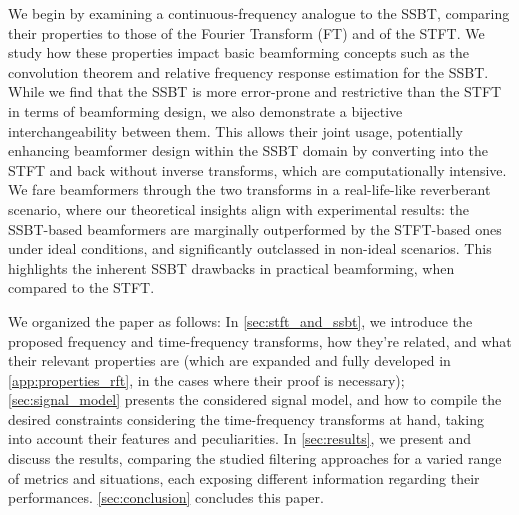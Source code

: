 
We begin by examining a continuous-frequency analogue to the SSBT, comparing their properties to those of the Fourier Transform (FT) and of the STFT. We study how these properties impact basic beamforming concepts such as the convolution theorem and relative frequency response estimation for the SSBT. While we find that the SSBT is more error-prone and restrictive than the STFT in terms of beamforming design, we also demonstrate a bijective interchangeability between them. This allows their joint usage, potentially enhancing beamformer design within the SSBT domain by converting into the STFT and back without inverse transforms, which are computationally intensive. We fare beamformers through the two transforms in a real-life-like reverberant scenario, where our theoretical insights align with experimental results: the SSBT-based beamformers are marginally outperformed by the STFT-based ones under ideal conditions, and significantly outclassed in non-ideal scenarios. This highlights the inherent SSBT drawbacks in practical beamforming, when compared to the STFT.


We organized the paper as follows:
In \cref{sec:stft_and_ssbt}, we introduce the proposed frequency and time-frequency transforms, how they're related, and what their relevant properties are (which are expanded and fully developed in \cref{app:properties_rft}, in the cases where their proof is necessary);
\cref{sec:signal_model} presents the considered signal model, and how to compile the desired constraints considering the time-frequency transforms at hand, taking into account their features and peculiarities.
In \cref{sec:results}, we present and discuss the results, comparing the studied filtering approaches for a varied range of metrics and situations, each exposing different information regarding their performances.
\cref{sec:conclusion} concludes this paper.


